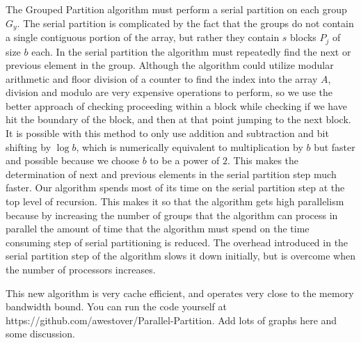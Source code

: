 \documentclass[twocolumn, twoside, 12pt]{article}
\renewcommand{\paragraph}[1]{\vspace{0.09in}\noindent{\bf \boldmath #1.}}
\begin{document}
\paragraph{Optimizations}
The Grouped Partition algorithm must perform a serial partition on each group $G_y$.
The serial partition is complicated by the fact that the groups do not contain a single contiguous portion of the array, but rather they contain $s$ blocks $P_j$ of size $b$ each.
In the serial partition the algorithm must repeatedly find the next or previous element in the group.
Although the algorithm could utilize modular arithmetic and floor division of a counter to find the index into the array $A$, division and modulo are very expensive operations to perform, so we use the better approach of checking proceeding within a block while checking if we have hit the boundary of the block, and then at that point jumping to the next block.
It is possible with this method to only use addition and subtraction and bit shifting by $\log b$, which is numerically equivalent to multiplication by $b$ but faster and possible because we choose $b$ to be a power of $2$.
This makes the determination of next and previous elements in the serial partition step much faster.
Our algorithm spends most of its time on the serial partition step at the top level of recursion.
This makes it so that the algorithm gets high parallelism because by increasing the number of groups that the algorithm can process in parallel the amount of time that the algorithm must spend on the time consuming step of serial partitioning is reduced.
The overhead introduced in the serial partition step of the algorithm slows it down initially, but is overcome when the number of processors increases.

\paragraph{Graphs}
This new algorithm is very cache efficient, and operates very close to the memory bandwidth bound.
You can run the code yourself at https://github.com/awestover/Parallel-Partition. Add lots of graphs here and some discussion. 
\end{document}
